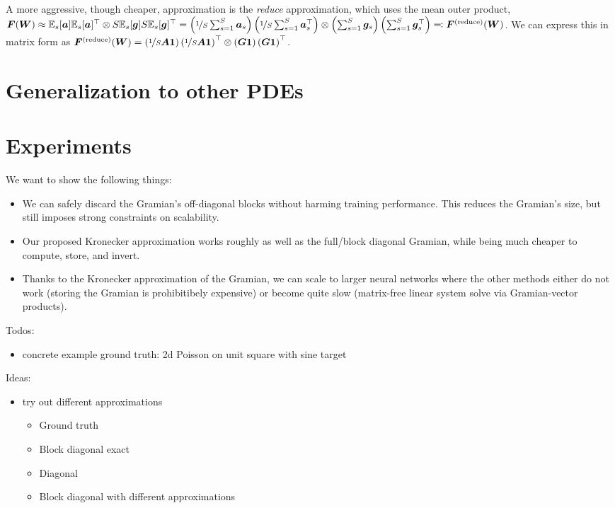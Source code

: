 \documentclass{article}
\begin{document}
A more aggressive, though cheaper, approximation is the \emph{reduce} approximation, which uses the mean outer product, ${\bm{F}}({\bm{W}}) \approx \mathbb{E}_s[{\bm{a}}] \mathbb{E}_s[{\bm{a}}]^{\top} \otimes S \mathbb{E}_s[{\bm{g}}] S \mathbb{E}_s[{\bm{g}}]^{\top} = \left(\nicefrac{1}{S} \sum_{s=1}^S {\bm{a}}_s \right) \left( \nicefrac{1}{S} \sum_{s=1}^S {\bm{a}}_s^{\top}\right) \otimes \left(\sum_{s=1}^S {\bm{g}}_s \right) \left(\sum_{s=1}^S {\bm{g}}_s^{\top} \right) \eqqcolon {\bm{F}}^{(\text{reduce})}({\bm{W}})$.
We can express this in matrix form as ${\bm{F}}^{(\text{reduce})}({\bm{W}}) = \left( \nicefrac{1}{S} {\bm{A}} {\bm{1}} \right) \left( \nicefrac{1}{S} {\bm{A}} {\bm{1}} \right)^{\top} \otimes \left({\bm{G}} {\bm{1}} \right) \left( {\bm{G}} {\bm{1}} \right)^{\top}$.

\section{Generalization to other PDEs}



\section{Experiments}

We want to show the following things:
\begin{itemize}
\item We can safely discard the Gramian's off-diagonal blocks without harming
  training performance. This reduces the Gramian's size, but still imposes
  strong constraints on scalability.

\item Our proposed Kronecker approximation works roughly as well as the
  full/block diagonal Gramian, while being much cheaper to compute, store, and
  invert.

\item Thanks to the Kronecker approximation of the Gramian, we can scale to larger neural networks where the other methods either do not work (storing the Gramian is prohibitibely expensive) or become quite slow (matrix-free linear system solve via Gramian-vector products).
\end{itemize}

Todos:
\begin{itemize}
\item concrete example ground truth: 2d Poisson on unit square with sine target
\end{itemize}

Ideas:
\begin{itemize}
\item try out different approximations
  \begin{itemize}
  \item Ground truth
  \item Block diagonal exact
  \item Diagonal
  \item Block diagonal with different approximations
  \end{itemize}
\end{itemize}
\end{document}

